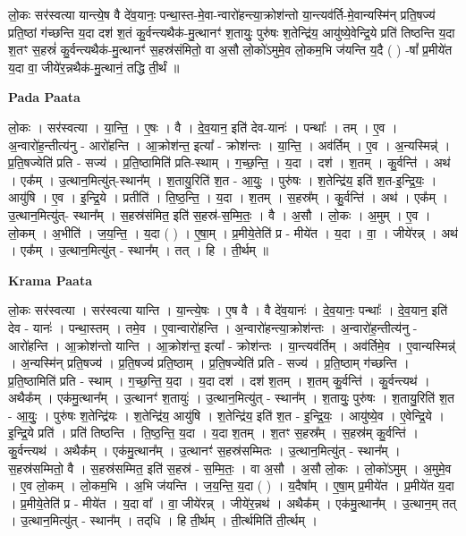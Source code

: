 \documentclass[17pt]{extarticle}
\begin{document}
लो॒कः सर॑स्वत्या यान्त्ये॒ष वै दे॑व॒यानः॒ पन्था॒स्त-मे॒वा-न्वारो॑हन्त्या॒क्रोश॑न्तो या॒न्त्यव॑र्ति-मे॒वान्यस्मि॑न् प्रति॒षज्य॑ प्रति॒ष्ठां ग॑च्छन्ति य॒दा दश॑ श॒तं कु॒र्वन्त्यथैक॑-मु॒त्थानꣳ॑ श॒तायुः॒ पुरु॑षः श॒तेन्द्रि॑य॒ आयु॑ष्ये॒वेन्द्रि॒ये प्रति॑ तिष्ठन्ति य॒दा श॒तꣳ स॒हस्रं॑ कु॒र्वन्त्यथैक॑-मु॒त्थानꣳ॑ स॒हस्र॑संमितो॒ वा अ॒सौ लो॒को॑ऽमुमे॒व लो॒कम॒भि ज॑यन्ति य॒दै ( ) -षां᳚ प्र॒मीये॑त य॒दा वा॒ जीये॑र॒न्नथैक॑-मु॒त्थानं॒ तद्धि ती॒र्थं ॥ \newline

\textbf{Pada Paata} \newline

लो॒कः । सर॑स्वत्या । या॒न्ति॒ । ए॒षः । वै । दे॒व॒यान॒ इति॑ देव-यानः॑ । पन्थाः᳚ । तम् । ए॒व । अ॒न्वारो॑ह॒न्तीत्य॑नु - आरो॑हन्ति । आ॒क्रोश॑न्त॒ इत्या᳚ - क्रोश॑न्तः । या॒न्ति॒ । अव॑र्तिम् । ए॒व । अ॒न्यस्मिन्न्॑ । प्र॒ति॒षज्येति॑ प्रति - सज्य॑ । प्र॒ति॒ष्ठामिति॑ प्रति-स्थाम् । ग॒च्छ॒न्ति॒ । य॒दा । दश॑ । श॒तम् । कु॒र्वन्ति॑ । अथ॑ । एक᳚म् । उ॒त्थान॒मित्यु॑त्-स्थान᳚म् । श॒तायु॒रिति॑ श॒त - आ॒युः॒ । पुरु॑षः । श॒तेन्द्रि॑य॒ इति॑ श॒त-इ॒न्द्रि॒यः॒ । आयु॑षि । ए॒व । इ॒न्द्रि॒ये । प्रतीति॑ । ति॒ष्ठ॒न्ति॒ । य॒दा । श॒तम् । स॒हस्र᳚म् । कु॒र्वन्ति॑ । अथ॑ । एक᳚म् । उ॒त्थान॒मित्यु॑त्- स्थान᳚म् । स॒हस्र॑संमित॒ इति॑ स॒हस्र॑-स॒म्मि॒तः॒ । वै । अ॒सौ । लो॒कः । अ॒मुम् । ए॒व । लो॒कम् । अ॒भीति॑ । ज॒य॒न्ति॒ । य॒दा ( ) । ए॒षा॒म् । प्र॒मीये॒तेति॑ प्र - मीये॑त । य॒दा । वा॒ । जीये॑रन्न् । अथ॑ । एक᳚म् । उ॒त्थान॒मित्यु॑त् - स्थान᳚म् । तत् । हि । ती॒र्थम् ॥  \newline


\textbf{Krama Paata} \newline

लो॒कः सर॑स्वत्या । सर॑स्वत्या यान्ति । या॒न्त्ये॒षः । ए॒ष वै । वै दे॑व॒यानः॑ । दे॒व॒यानः॒ पन्थाः᳚ । दे॒व॒यान॒ इति॑ देव - यानः॑ । पन्था॒स्तम् । तमे॒व । ए॒वान्वारो॑हन्ति । अ॒न्वारो॑हन्त्या॒क्रोश॑न्तः । अ॒न्वारो॑ह॒न्तीत्य॑नु - आरो॑हन्ति । आ॒क्रोश॑न्तो यान्ति । आ॒क्रोश॑न्त॒ इत्या᳚ - क्रोश॑न्तः । या॒न्त्यव॑र्तिम् । अव॑र्तिमे॒व । ए॒वान्यस्मिन्न्॑ । अ॒न्यस्मि॑न् प्रति॒षज्य॑ । प्र॒ति॒षज्य॑ प्रति॒ष्ठाम् । प्र॒ति॒षज्येति॑ प्रति - सज्य॑ । प्र॒ति॒ष्ठाम् ग॑च्छन्ति । प्र॒ति॒ष्ठामिति॑ प्रति - स्थाम् । ग॒च्छ॒न्ति॒ य॒दा । य॒दा दश॑ । दश॑ श॒तम् । श॒तम् कु॒र्वन्ति॑ । कु॒र्वन्त्यथ॑ । अथैक᳚म् । एक॑मु॒त्थान᳚म् । उ॒त्थानꣳ॑ श॒तायुः॑ । उ॒त्थान॒मित्यु॑त् - स्थान᳚म् । श॒तायुः॒ पुरु॑षः । श॒तायु॒रिति॑ श॒त - आ॒युः॒ । पुरु॑षः श॒तेन्द्रि॑यः । श॒तेन्द्रि॑य॒ आयु॑षि । श॒तेन्द्रि॑य॒ इति॑ श॒त - इ॒न्द्रि॒यः॒ । आयु॑ष्ये॒व । ए॒वेन्द्रि॒ये । इ॒न्द्रि॒ये प्रति॑ । प्रति॑ तिष्ठन्ति । ति॒ष्ठ॒न्ति॒ य॒दा । य॒दा श॒तम् । श॒तꣳ स॒हस्र᳚म् । स॒हस्र॑म् कु॒र्वन्ति॑ । कु॒र्वन्त्यथ॑ । अथैक᳚म् । एक॑मु॒त्थान᳚म् । उ॒त्थानꣳ॑ स॒हस्र॑सम्मितः । उ॒त्थान॒मित्यु॑त् - स्थान᳚म् । स॒हस्र॑सम्मितो॒ वै । स॒हस्र॑सम्मित॒ इति॑ स॒हस्र॑ - स॒म्मि॒तः॒ । वा अ॒सौ । अ॒सौ लो॒कः । लो॒को॑ऽमुम् । अ॒मुमे॒व । ए॒व लो॒कम् । लो॒कम॒भि । अ॒भि ज॑यन्ति । ज॒य॒न्ति॒ य॒दा ( ) । य॒दैषा᳚म् । ए॒षा॒म् प्र॒मीये॑त । प्र॒मीये॑त य॒दा । प्र॒मीये॒तेति॑ प्र - मीये॑त । य॒दा वा᳚ । वा॒ जीये॑रन्न् । जीये॑र॒न्नथ॑ । अथैक᳚म् । एक॑मु॒त्थान᳚म् । उ॒त्थान॒म् तत् । उ॒त्थान॒मित्यु॑त् - स्थान᳚म् । तद्‌धि । हि ती॒र्थम् । ती॒र्त्थमिति॑ ती॒र्त्थम् । \newline
\end{document}
